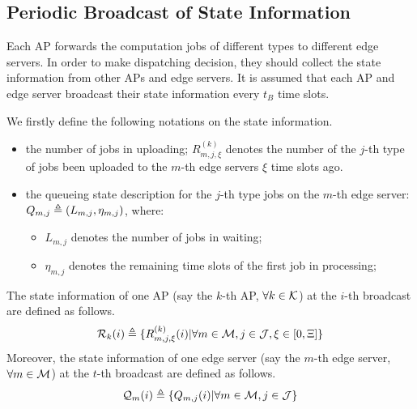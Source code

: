 
\subsection{Periodic Broadcast of State Information}
Each AP forwards the computation jobs of different types to different edge servers.
In order to make dispatching decision, they should collect the state information from other APs and edge servers.
It is assumed that each AP and edge server broadcast their state information every $t_B$ time slots.

We firstly define the following notations on the state information.
\begin{itemize}
    \item the number of jobs in uploading;
        $R^{(k)}_{m,j,\xi}$ denotes the number of the $j$-th type of jobs been uploaded to the $m$-th edge servers $\xi$ time slots ago.
    \item the queueing state description for the $j$-th type jobs on the $m$-th edge server: $Q_{m,j} \triangleq (L_{m,j}, \eta_{m,j})$, where:
    \begin{itemize}
        \item $L_{m,j}$ denotes the number of jobs in waiting;
        \item $\eta_{m,j}$ denotes the remaining time slots of the first job in processing;
    \end{itemize}
\end{itemize}

The state information of one AP (say the $k$-th AP, $\forall k\in\mathcal{K}$) at the $i$-th broadcast are defined as follows.
\begin{align}
    \mathcal{R}_{k}(i) \triangleq \{R^{(k)}_{m,j,\xi}(i) | \forall m\in\mathcal{M}, j\in\mathcal{J}, \xi \in [0,\Xi]\}
\end{align}
Moreover, the state information of one edge server (say the $m$-th edge server, $\forall m\in\mathcal{M}$) at the $t$-th broadcast are defined as follows.
\begin{align}
    \mathcal{Q}_{m}(i) \triangleq \{Q_{m,j}(i) | \forall m\in\mathcal{M}, j\in\mathcal{J}\}
\end{align}


